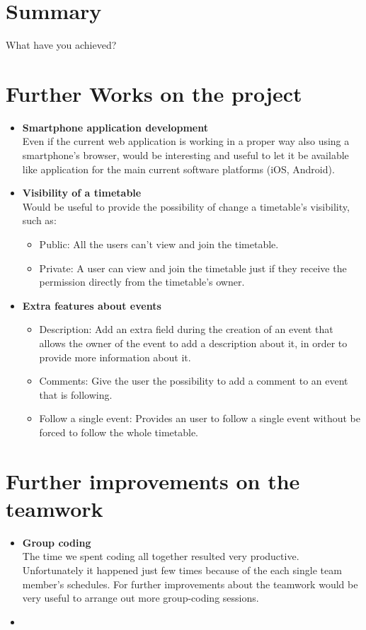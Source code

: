 
\section{Summary}
\vspace{-5mm}
What have you achieved?

\section{Further Works on the project}
\vspace{-5mm}
\begin{itemize}
\item \textbf{Smartphone application development}\\ Even if the current web application is working in a proper way also using a smartphone's browser, would be interesting and useful to let it be available like application for the main current software platforms (iOS, Android).
\item \textbf{Visibility of a timetable}\\
Would be useful to provide the possibility of change a timetable's visibility, such as:
\vspace{-3mm}
\begin{itemize}
	\item Public: All the users can't view and join the timetable.
	\item Private: A user can view and join the timetable just if they receive the permission directly from the timetable's owner.
\end{itemize}
\item \textbf{Extra features about events}
\vspace{-3mm}
\begin{itemize}
	\item Description: Add an extra field during the creation of an event that allows the owner of the event to add a description about it, in order to provide more information about it.
	\item Comments: Give the user the possibility to add a comment to an event that is following.
	\item Follow a single event: Provides an user to follow a single event without be forced to follow the whole timetable.
\end{itemize}
\end{itemize}

\section{Further improvements on the teamwork}
\vspace{-5mm}
\begin{itemize}
 \item \textbf{Group coding} \\ The time we spent coding all together resulted very productive. Unfortunately it happened just few times because of the each single team member's schedules. For further improvements about the teamwork would be very useful to arrange out more group-coding sessions.
 \item 
\end{itemize}